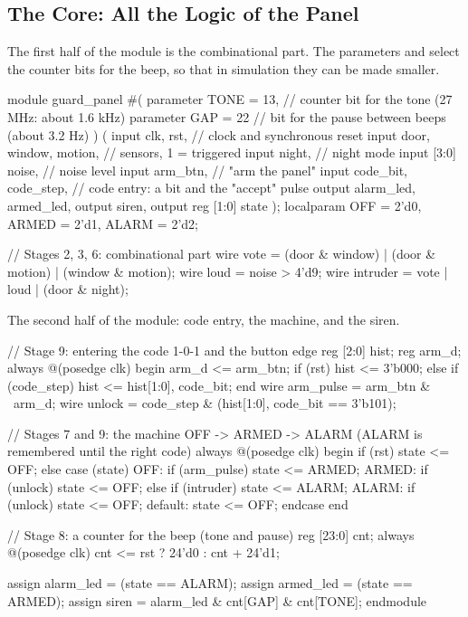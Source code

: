 \subsection{The Core: All the Logic of the Panel}

The first half of the module is the combinational part. The parameters
 and  select the counter bits for the beep, so that in
simulation they can be made smaller.

\begin{vcode}
module guard_panel #(
    parameter TONE = 13,         // counter bit for the tone (27 MHz: about 1.6 kHz)
    parameter GAP  = 22          // bit for the pause between beeps (about 3.2 Hz)
) (
    input        clk, rst,                     // clock and synchronous reset
    input        door, window, motion,         // sensors, 1 = triggered
    input        night,                        // night mode
    input  [3:0] noise,                        // noise level
    input        arm_btn,                      // "arm the panel"
    input        code_bit, code_step,          // code entry: a bit and the "accept" pulse
    output       alarm_led, armed_led,
    output       siren,
    output reg [1:0] state
);
    localparam OFF = 2'd0, ARMED = 2'd1, ALARM = 2'd2;

    // Stages 2, 3, 6: combinational part
    wire vote     = (door & window) | (door & motion) | (window & motion);
    wire loud     = noise > 4'd9;
    wire intruder = vote | loud | (door & night);

\end{vcode}

The second half of the module: code entry, the machine, and the siren.

\begin{vcode}
    // Stage 9: entering the code 1-0-1 and the button edge
    reg [2:0] hist;
    reg       arm_d;
    always @(posedge clk) begin
        arm_d <= arm_btn;
        if (rst)            hist <= 3'b000;
        else if (code_step) hist <= {hist[1:0], code_bit};
    end
    wire arm_pulse = arm_btn & ~arm_d;
    wire unlock    = code_step & ({hist[1:0], code_bit} == 3'b101);

    // Stages 7 and 9: the machine OFF -> ARMED -> ALARM (ALARM is remembered until the right code)
    always @(posedge clk) begin
        if (rst) state <= OFF;
        else case (state)
            OFF:     if (arm_pulse) state <= ARMED;
            ARMED:   if (unlock)        state <= OFF;
                     else if (intruder) state <= ALARM;
            ALARM:   if (unlock) state <= OFF;
            default: state <= OFF;
        endcase
    end

    // Stage 8: a counter for the beep (tone and pause)
    reg [23:0] cnt;
    always @(posedge clk) cnt <= rst ? 24'd0 : cnt + 24'd1;

    assign alarm_led = (state == ALARM);
    assign armed_led = (state == ARMED);
    assign siren     = alarm_led & cnt[GAP] & cnt[TONE];
endmodule
\end{vcode}


